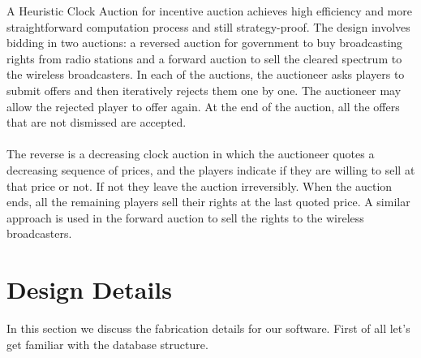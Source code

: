 \documentclass[a4paper]{article}
\begin{document}
A Heuristic Clock Auction for incentive auction achieves high efficiency and more straightforward computation process and still strategy-proof. The design involves bidding in two auctions: a reversed auction for government to buy broadcasting rights from radio stations and a forward auction to sell the cleared spectrum to the wireless broadcasters. In each of the auctions, the auctioneer asks players to submit offers and then iteratively rejects them one by one. The auctioneer may allow the rejected player to offer again. At the end of the auction, all the offers that are not dismissed are accepted.
\\\\
The reverse is a decreasing clock auction in which the auctioneer quotes a decreasing sequence of prices, and the players indicate if they are willing to sell at that price or not. If not they leave the auction irreversibly. When the auction ends, all the remaining players sell their rights at the last quoted price. A similar approach is used in the forward auction to sell the rights to the wireless broadcasters.



\pagebreak
\section*{Design Details}
In this section we discuss the fabrication details for our software. 
First of all let's get familiar with the database structure.
\end{document}
